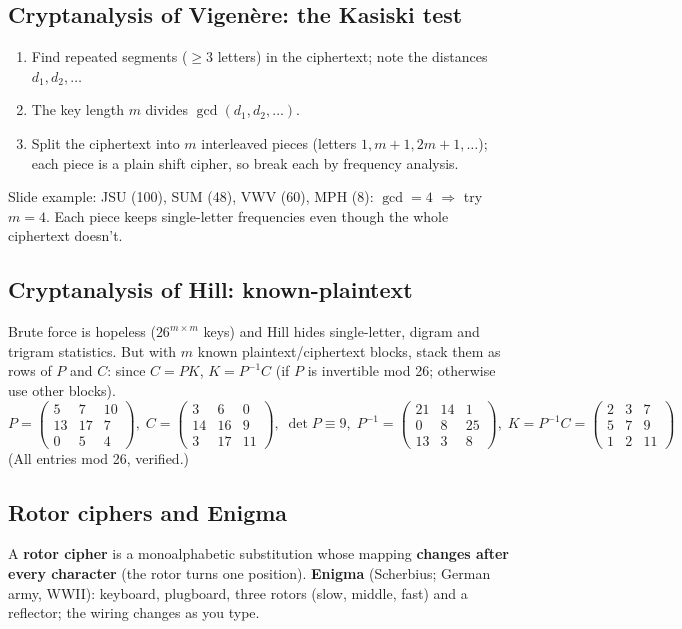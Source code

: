 \subsection{Cryptanalysis of Vigen\`ere: the Kasiski test}
\begin{enumerate}[leftmargin=1.5em]
  \item Find repeated segments ($\ge 3$ letters) in the ciphertext; note the distances $d_1, d_2, \dots$
  \item The key length $m$ divides $\gcd(d_1, d_2, \dots)$.
  \item Split the ciphertext into $m$ interleaved pieces (letters $1, m{+}1, 2m{+}1, \dots$); each piece is a plain shift cipher, so break each by frequency analysis.
\end{enumerate}
Slide example: JSU (100), SUM (48), VWV (60), MPH (8): $\gcd = 4$ $\Rightarrow$ try $m = 4$. Each piece keeps single-letter frequencies even though the whole ciphertext doesn't.

\subsection{Cryptanalysis of Hill: known-plaintext}
Brute force is hopeless ($26^{m \times m}$ keys) and Hill hides single-letter, digram and trigram statistics. But with $m$ known plaintext/ciphertext blocks, stack them as rows of $P$ and $C$: since $C = PK$, \;$\boxed{K = P^{-1}C}$ (if $P$ is invertible mod 26; otherwise use other blocks).
\[
P = \begin{pmatrix}5&7&10\\13&17&7\\0&5&4\end{pmatrix},\;
C = \begin{pmatrix}3&6&0\\14&16&9\\3&17&11\end{pmatrix},\;
\det P \equiv 9,\;
P^{-1} = \begin{pmatrix}21&14&1\\0&8&25\\13&3&8\end{pmatrix},\;
K = P^{-1}C = \begin{pmatrix}2&3&7\\5&7&9\\1&2&11\end{pmatrix}
\]
(All entries mod 26, verified.)

\subsection{Rotor ciphers and Enigma}
A \textbf{rotor cipher} is a monoalphabetic substitution whose mapping \textbf{changes after every character} (the rotor turns one position). \textbf{Enigma} (Scherbius; German army, WWII): keyboard, plugboard, three rotors (slow, middle, fast) and a reflector; the wiring changes as you type.

